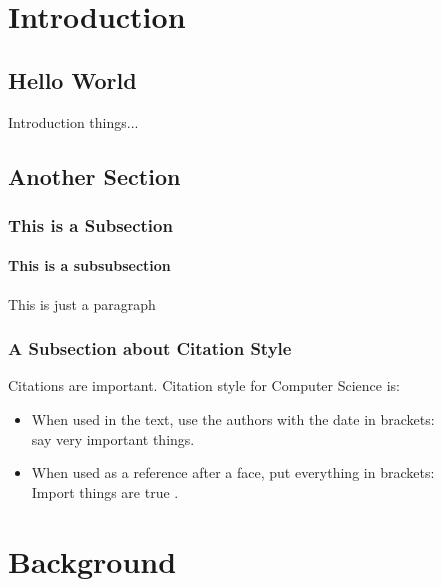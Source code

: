 \documentclass[a4paper,twoside,12pt]{report}
\begin{document}
{}
\tableofcontents
\newpage
{}
{}
\listoffigures
\newpage
{}
{}
\listoftables
\newpage
{}


\chapter{Introduction}

\section{Hello World}

Introduction things...\\

\section{Another Section}

\subsection{This is a Subsection}

\subsubsection{This is a subsubsection}

This is just a paragraph

\subsection{A Subsection about Citation Style}

Citations are important. Citation style for Computer Science is:

\begin{itemize}
    \item When used in the text, use the authors with the date in brackets:\\ \citet{klein17} say very important things.
    \item When used as a reference after a face, put everything in brackets:\\ Import things are true \citep{klein17}.
\end{itemize}


\chapter{Background}
\label{background}
\end{document}

